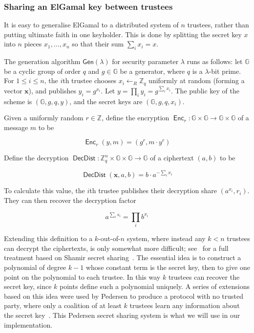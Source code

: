 \documentclass[12pt,a4paper]{article}
\DeclareMathOperator{\Enc}{\mathsf{Enc}}
\DeclareMathOperator{\DecDist}{\mathsf{DecDist}}
\theoremstyle{definition}
\begin{document}
\subsubsection{Sharing an ElGamal key between trustees}
It is easy to generalise ElGamal to a distributed system of $n$ trustees, rather than putting ultimate faith in one keyholder. This is done by splitting the secret key $x$ into $n$ pieces $x_1, \ldots, x_n$ so that their sum $\sum_i x_i = x$.
\newpage
\begin{definition}
    The generation algorithm $\mathsf{Gen}(\lambda)$ for security parameter $\lambda$ runs as follows: let $\mathbb{G}$ be a cyclic group of order $q$ and $g\in\mathbb{G}$ be a generator, where $q$ is a $\lambda$-bit prime. For $1\leq i\leq n$, the $i$th trustee chooses $x_i\gets_R\mathbb{Z}_q$ uniformly at random (forming a vector $\mathbf{x}$), and publishes $y_i=g^{x_i}$. Let $y=\prod_i y_i=g^{\sum_i x_i}$. The public key of the scheme is $(\mathbb{G}, g, q, y)$, and the secret keys are $(\mathbb{G}, g, q, x_i)$.

    Given a uniformly random $r\in\mathbb{Z}$, define the encryption $\Enc_r:\mathbb{G}\times\mathbb{G}\rightarrow\mathbb{G}\times\mathbb{G}$ of a message $m$ to be
    
    $$\Enc_r(y, m) = (g^r, m\cdot y^r)$$

    Define the decryption $\DecDist:\mathbb{Z}_q^n\times\mathbb{G}\times\mathbb{G}\rightarrow \mathbb{G}$ of a ciphertext $(a, b)$ to be
    
    $$\DecDist(\mathbf{x}, a, b)=b\cdot a^{-\sum_i x_i}$$
    
    To calculate this value, the $i$th trustee publishes their decryption share $\left(a^{x_i}, r_i\right)$. They can then recover the decryption factor
    
    $$a^{\sum_i s_i}=\prod_i{b^{x_i}}$$
\end{definition}

Extending this definition to a $k$-out-of-$n$ system, where instead any $k<n$ trustees can decrypt the ciphertexts, is only somewhat more difficult; see~\cite{pedersen1991threshold} for a full treatment based on Shamir secret sharing~\cite{shamir1979share}. The essential idea is to construct a polynomial of degree $k-1$ whose constant term is the secret key, then to give one point on the polynomial to each trustee. In this way $k$ trustees can recover the secret key, since $k$ points define such a polynomial uniquely. A series of extensions based on this idea were used by Pedersen to produce a protocol with no trusted party, where only a coalition of at least $k$ trustees learn any information about the secret key~\cite{pedersen1991threshold}. This Pedersen secret sharing system is what we will use in our implementation.
\end{document}
